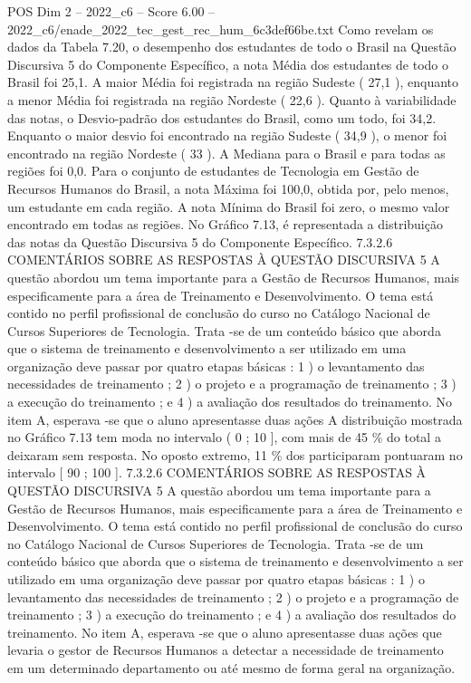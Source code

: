 \begin{textsample}{POS Dim 2 – 2022\_c6 – Score 6.00 – 2022\_c6/enade\_2022\_tec\_gest\_rec\_hum\_6c3def66be.txt}
Como revelam os dados da Tabela 7.20, o desempenho dos estudantes de todo o Brasil na Questão Discursiva 5 do Componente Específico, a nota Média dos estudantes de todo o Brasil foi 25,1.
A maior Média foi registrada na região Sudeste ( 27,1 ), enquanto a menor Média foi registrada na região Nordeste ( 22,6 ).
Quanto à variabilidade das notas, o Desvio-padrão dos estudantes do Brasil, como um todo, foi 34,2.
Enquanto o maior desvio foi encontrado na região Sudeste ( 34,9 ), o menor foi encontrado na região Nordeste ( 33 ).
A Mediana para o Brasil e para todas as regiões foi 0,0.
Para o conjunto de estudantes de Tecnologia em Gestão de Recursos Humanos do Brasil, a nota Máxima foi 100,0, obtida por, pelo menos, um estudante em cada região.
A nota Mínima do Brasil foi zero, o mesmo valor encontrado em todas as regiões.
No Gráfico 7.13, é representada a distribuição das notas da Questão Discursiva 5 do Componente Específico. 7.3.2.6 COMENTÁRIOS SOBRE AS RESPOSTAS À QUESTÃO DISCURSIVA 5 A questão abordou um tema importante para a Gestão de Recursos Humanos, mais especificamente para a área de Treinamento e Desenvolvimento.
O tema está contido no perfil profissional de conclusão do curso no Catálogo Nacional de Cursos Superiores de Tecnologia.
Trata -se de um conteúdo básico que aborda que o sistema de treinamento e desenvolvimento a ser utilizado em uma organização deve passar por quatro etapas básicas : 1 ) o levantamento das necessidades de treinamento ; 2 ) o projeto e a programação de treinamento ; 3 ) a execução do treinamento ; e 4 ) a avaliação dos resultados do treinamento.
No item A, esperava -se que o aluno apresentasse duas ações A distribuição mostrada no Gráfico 7.13 tem moda no intervalo ( 0 ; 10 ], com mais de 45 \% do total a deixaram sem resposta.
No oposto extremo, 11 \% dos participaram pontuaram no intervalo [ 90 ; 100 ]. 7.3.2.6 COMENTÁRIOS SOBRE AS RESPOSTAS À QUESTÃO DISCURSIVA 5 A questão abordou um tema importante para a Gestão de Recursos Humanos, mais especificamente para a área de Treinamento e Desenvolvimento.
O tema está contido no perfil profissional de conclusão do curso no Catálogo Nacional de Cursos Superiores de Tecnologia.
Trata -se de um conteúdo básico que aborda que o sistema de treinamento e desenvolvimento a ser utilizado em uma organização deve passar por quatro etapas básicas : 1 ) o levantamento das necessidades de treinamento ; 2 ) o projeto e a programação de treinamento ; 3 ) a execução do treinamento ; e 4 ) a avaliação dos resultados do treinamento.
No item A, esperava -se que o aluno apresentasse duas ações que levaria o gestor de Recursos Humanos a detectar a necessidade de treinamento em um determinado departamento ou até mesmo de forma geral na organização.

\end{textsample}
